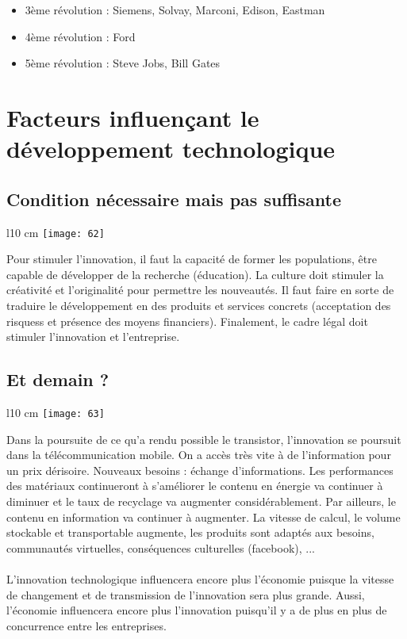 \begin{itemize}
	\item 3ème révolution : Siemens, Solvay, Marconi, Edison, Eastman
	\item 4ème révolution : Ford
	\item 5ème révolution : Steve Jobs, Bill Gates
\end{itemize}

\section{Facteurs influençant le développement technologique}
\subsection{Condition nécessaire mais pas suffisante}
\begin{wrapfigure}[13]{l}{10 cm}
	\texttt{[image: 62]}
\end{wrapfigure}
Pour stimuler l'innovation, il faut la capacité de former les populations, être capable de développer de la recherche (éducation). La culture doit stimuler la créativité et l'originalité pour permettre les nouveautés. Il faut faire en sorte de traduire le développement en des produits et services concrets (acceptation des risquess et présence des moyens financiers). Finalement, le cadre légal doit stimuler l'innovation et l'entreprise.  

\subsection{Et demain ?}
\begin{wrapfigure}[15]{l}{10 cm}
	\texttt{[image: 63]}
\end{wrapfigure}
Dans la poursuite de ce qu'a rendu possible le transistor, l'innovation se poursuit dans la télécommunication mobile. On a accès très vite à de l'information pour un prix dérisoire. Nouveaux besoins : échange d'informations. Les performances des matériaux continueront à s’améliorer le contenu en énergie va continuer à diminuer et le taux de recyclage va augmenter considérablement. Par ailleurs, le contenu en information va continuer à augmenter. La vitesse de calcul, le volume stockable et transportable augmente, les produits sont adaptés aux besoins, communautés virtuelles, conséquences culturelles (facebook), ... 
\\\\
L’innovation technologique influencera encore plus
l’économie puisque la vitesse de changement et de transmission de l'innovation sera plus grande. Aussi, l'économie influencera encore plus l'innovation puisqu'il y a de plus en plus de concurrence entre les entreprises. 

